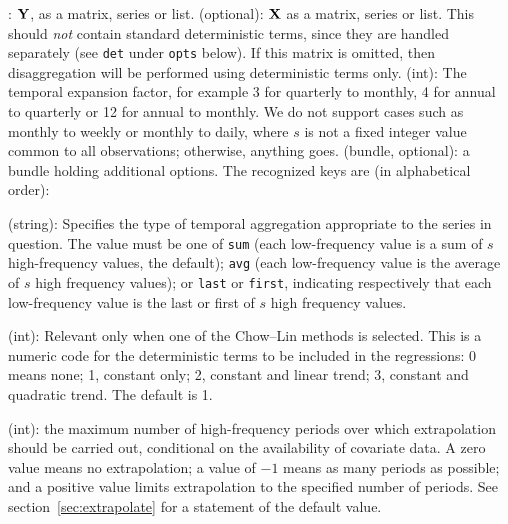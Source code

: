 \begin{description}
\tditem[Y0]: $\mathbf{Y}$, as a matrix, series or list.
\tditem[X](optional): $\mathbf{X}$ as a matrix, series or list.  This
  should \textit{not} contain standard deterministic terms, since they
  are handled separately (see \texttt{det} under \texttt{opts}
  below). If this matrix is omitted, then disaggregation will be
  performed using deterministic terms only.
\tditem[s](int): The temporal expansion factor, for example 3
  for quarterly to monthly, 4 for annual to quarterly or 12 for annual
  to monthly.  We do not support cases such as monthly to weekly or
  monthly to daily, where $s$ is not a fixed integer value common to
  all observations; otherwise, anything goes.
\tditem[opts](bundle, optional): a bundle holding additional
  options. The recognized keys are (in alphabetical order):
  \begin{description}
    \tditem[aggtype](string): Specifies the type of temporal
    aggregation appropriate to the series in question. The value must
    be one of \texttt{sum} (each low-frequency value is a sum of $s$
    high-frequency values, the default); \texttt{avg} (each
    low-frequency value is the average of $s$ high frequency values);
    or \texttt{last} or \texttt{first}, indicating respectively that
    each low-frequency value is the last or first of $s$ high
    frequency values.

    \tditem[det](int): Relevant only when one of the Chow--Lin methods
    is selected. This is a numeric code for the deterministic terms to
    be included in the regressions: 0 means none; 1, constant only; 2,
    constant and linear trend; 3, constant and quadratic trend. The
    default is 1.

    \tditem[extmax](int): the maximum number of high-frequency periods
    over which extrapolation should be carried out, conditional on the
    availability of covariate data. A zero value means no
    extrapolation; a value of $-1$ means as many periods as possible;
    and a positive value limits extrapolation to the specified number
    of periods. See section~\ref{sec:extrapolate} for a statement of
    the default value.


\end{description}
\end{description}
